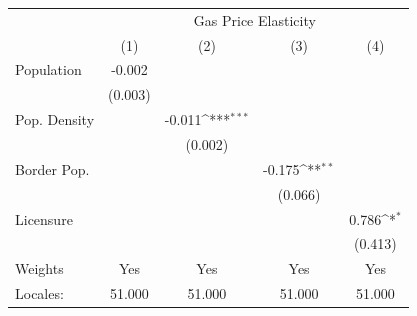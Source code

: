 {
\def\sym#1{\ifmmode^{#1}\else\(^{#1}\)\fi}
\begin{tabular}{l*{4}{c}}
\hline\hline
            &\multicolumn{4}{c}{Gas Price Elasticity}                                               \\
            &\multicolumn{1}{c}{(1)}         &\multicolumn{1}{c}{(2)}         &\multicolumn{1}{c}{(3)}         &\multicolumn{1}{c}{(4)}         \\
\hline
Population  &      -0.002         &                     &                     &                     \\
            &     (0.003)         &                     &                     &                     \\
[1em]
Pop. Density&                     &      -0.011\sym{***}&                     &                     \\
            &                     &     (0.002)         &                     &                     \\
[1em]
Border Pop. &                     &                     &      -0.175\sym{**} &                     \\
            &                     &                     &     (0.066)         &                     \\
[1em]
Licensure   &                     &                     &                     &       0.786\sym{*}  \\
            &                     &                     &                     &     (0.413)         \\
\hline
Weights     &         Yes         &         Yes         &         Yes         &         Yes         \\
Locales:    &      51.000         &      51.000         &      51.000         &      51.000         \\
\hline\hline
\end{tabular}
}
